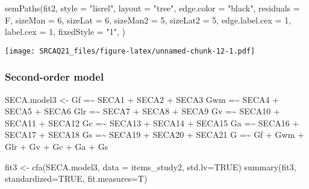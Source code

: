 \documentclass[
]{article}
\newenvironment{Shaded}{\begin{snugshade}}{\end{snugshade}}
\newcommand{\AttributeTok}[1]{\textcolor[rgb]{0.77,0.63,0.00}{#1}}
\newcommand{\ConstantTok}[1]{\textcolor[rgb]{0.00,0.00,0.00}{#1}}
\newcommand{\DecValTok}[1]{\textcolor[rgb]{0.00,0.00,0.81}{#1}}
\newcommand{\FunctionTok}[1]{\textcolor[rgb]{0.00,0.00,0.00}{#1}}
\newcommand{\NormalTok}[1]{#1}
\newcommand{\OtherTok}[1]{\textcolor[rgb]{0.56,0.35,0.01}{#1}}
\newcommand{\StringTok}[1]{\textcolor[rgb]{0.31,0.60,0.02}{#1}}
\begin{document}
\begin{Shaded}
\begin{Highlighting}[]
\FunctionTok{semPaths}\NormalTok{(fit2, }\AttributeTok{style =} \StringTok{"lisrel"}\NormalTok{, }\AttributeTok{layout =} \StringTok{"tree"}\NormalTok{, }\AttributeTok{edge.color =} \StringTok{"black"}\NormalTok{,}
         \AttributeTok{residuals =}\NormalTok{ F, }\AttributeTok{sizeMan =} \DecValTok{6}\NormalTok{, }\AttributeTok{sizeLat =} \DecValTok{6}\NormalTok{, }\AttributeTok{sizeMan2 =} \DecValTok{5}\NormalTok{, }\AttributeTok{sizeLat2 =} \DecValTok{5}\NormalTok{, }
         \AttributeTok{edge.label.cex =} \DecValTok{1}\NormalTok{, }\AttributeTok{label.cex =} \DecValTok{1}\NormalTok{, }\AttributeTok{fixedStyle =} \StringTok{"1"}\NormalTok{, )}
\end{Highlighting}
\end{Shaded}

\texttt{[image: SRCAQ21\_files/figure-latex/unnamed-chunk-12-1.pdf]}

\hypertarget{second-order-model}{%
\subsubsection{Second-order model}\label{second-order-model}}

\begin{Shaded}
\begin{Highlighting}[]
\NormalTok{SECA.model3 }\OtherTok{\textless{}{-}} \StringTok{\textquotesingle{} }
\StringTok{Gf  =\textasciitilde{} SECA1 + SECA2 + SECA3}
\StringTok{Gwm =\textasciitilde{} SECA4 + SECA5 + SECA6}
\StringTok{Glr  =\textasciitilde{} SECA7 + SECA8 + SECA9}
\StringTok{Gv =\textasciitilde{} SECA10 + SECA11 + SECA12}
\StringTok{Gc =\textasciitilde{} SECA13 + SECA14 + SECA15}
\StringTok{Ga =\textasciitilde{} SECA16 + SECA17 + SECA18}
\StringTok{Gs =\textasciitilde{} SECA19 + SECA20 + SECA21}
\StringTok{G =\textasciitilde{} Gf + Gwm + Glr + Gv + Gc + Ga + Gs}
\StringTok{\textquotesingle{}}

\NormalTok{fit3 }\OtherTok{\textless{}{-}} \FunctionTok{cfa}\NormalTok{(SECA.model3, }\AttributeTok{data =}\NormalTok{ items\_study2, }\AttributeTok{std.lv=}\ConstantTok{TRUE}\NormalTok{)}
\FunctionTok{summary}\NormalTok{(fit3, }\AttributeTok{standardized=}\ConstantTok{TRUE}\NormalTok{, }\AttributeTok{fit.measures=}\NormalTok{T)}
\end{Highlighting}
\end{Shaded}
\end{document}
